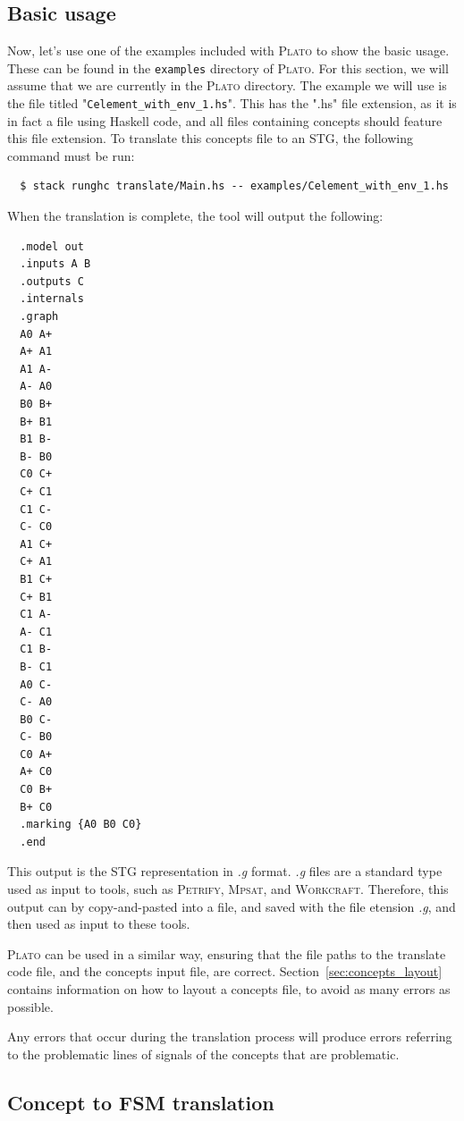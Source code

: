 \documentclass[british,technote,compsoc]{IEEEtran}
\newcommand{\noun}[1]{\textsc{#1}}
\begin{document}
\subsection{Basic usage \label{sub:basic}}

Now, let's use one of the examples included with \noun{Plato} to show the basic usage. These can be found in the \texttt{examples} directory of \noun{Plato}. 
For this section, we will assume that we are currently in the \noun{Plato} directory. The example we will use is the file titled "\texttt{Celement\_with\_env\_1.hs}". 
This has the ".hs" file extension, as it is in fact a file using Haskell code, and all files containing concepts should feature this file extension. 
To translate this concepts file to an STG, the following command must be run:

\begin{verbatim}
  $ stack runghc translate/Main.hs -- examples/Celement_with_env_1.hs
\end{verbatim}

When the translation is complete, the tool will output the following:

\begin{verbatim}
  .model out
  .inputs A B
  .outputs C
  .internals
  .graph
  A0 A+
  A+ A1
  A1 A-
  A- A0
  B0 B+
  B+ B1
  B1 B-
  B- B0
  C0 C+
  C+ C1
  C1 C-
  C- C0
  A1 C+
  C+ A1
  B1 C+
  C+ B1
  C1 A-
  A- C1
  C1 B-
  B- C1
  A0 C-
  C- A0
  B0 C-
  C- B0
  C0 A+
  A+ C0
  C0 B+
  B+ C0
  .marking {A0 B0 C0}
  .end
\end{verbatim}

This output is the STG representation in \emph{.g} format. \emph{.g} files are a standard type used as input to tools, such as \noun{Petrify}, \noun{Mpsat}, and \noun{Workcraft}. 
Therefore, this output can by copy-and-pasted into a file, and saved with the file etension \emph{.g}, and then used as input to these tools. 

\noun{Plato} can be used in a similar way, ensuring that the file paths to the translate code file, and the concepts input file, are correct. Section~\ref{sec:concepts_layout} contains 
information on how to layout a concepts file, to avoid as many errors as possible. 

Any errors that occur during the translation process will produce errors referring to the problematic lines of signals of the concepts that are problematic. 

\subsection{Concept to FSM translation}
\end{document}
